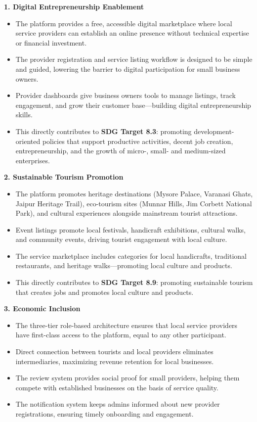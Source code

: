 \textbf{1. Digital Entrepreneurship Enablement}
\begin{itemize}[leftmargin=2em]
    \item The platform provides a free, accessible digital marketplace where local service providers can establish an online presence without technical expertise or financial investment.
    \item The provider registration and service listing workflow is designed to be simple and guided, lowering the barrier to digital participation for small business owners.
    \item Provider dashboards give business owners tools to manage listings, track engagement, and grow their customer base---building digital entrepreneurship skills.
    \item This directly contributes to \textbf{SDG Target 8.3}: promoting development-oriented policies that support productive activities, decent job creation, entrepreneurship, and the growth of micro-, small- and medium-sized enterprises.
\end{itemize}

\textbf{2. Sustainable Tourism Promotion}
\begin{itemize}[leftmargin=2em]
    \item The platform promotes heritage destinations (Mysore Palace, Varanasi Ghats, Jaipur Heritage Trail), eco-tourism sites (Munnar Hills, Jim Corbett National Park), and cultural experiences alongside mainstream tourist attractions.
    \item Event listings promote local festivals, handicraft exhibitions, cultural walks, and community events, driving tourist engagement with local culture.
    \item The service marketplace includes categories for local handicrafts, traditional restaurants, and heritage walks---promoting local culture and products.
    \item This directly contributes to \textbf{SDG Target 8.9}: promoting sustainable tourism that creates jobs and promotes local culture and products.
\end{itemize}

\textbf{3. Economic Inclusion}
\begin{itemize}[leftmargin=2em]
    \item The three-tier role-based architecture ensures that local service providers have first-class access to the platform, equal to any other participant.
    \item Direct connection between tourists and local providers eliminates intermediaries, maximizing revenue retention for local businesses.
    \item The review system provides social proof for small providers, helping them compete with established businesses on the basis of service quality.
    \item The notification system keeps admins informed about new provider registrations, ensuring timely onboarding and engagement.
\end{itemize}

